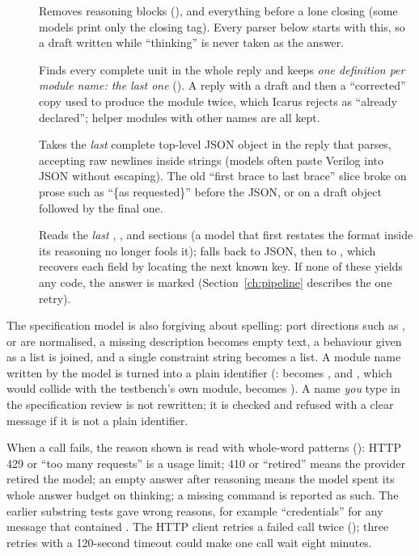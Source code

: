 \begin{description}
  \item[] Removes reasoning blocks (), and everything before a lone closing  (some models print only the closing tag). Every parser below starts with this, so a draft written while ``thinking'' is never taken as the answer.
  \item[] Finds every complete  unit in the whole reply and keeps \emph{one definition per module name: the last one} (). A reply with a draft and then a ``corrected'' copy used to produce the module twice, which Icarus rejects as ``already declared''; helper modules with other names are all kept.
  \item[] Takes the \emph{last} complete top-level JSON object in the reply that parses, accepting raw newlines inside strings (models often paste Verilog into JSON without escaping). The old ``first brace to last brace'' slice broke on prose such as ``\{as requested\}'' before the JSON, or on a draft object followed by the final one.
  \item[] Reads the \emph{last} , ,  and  sections (a model that first restates the format inside its reasoning no longer fools it); falls back to JSON, then to , which recovers each field by locating the next known key. If none of these yields any code, the answer is marked  (Section~\ref{ch:pipeline} describes the one retry).
\end{description}

The specification model is also forgiving about spelling: port directions such as ,  or  are normalised, a missing description becomes empty text, a behaviour given as a list is joined, and a single constraint string becomes a list. A module name written by the model is turned into a plain identifier (:  becomes , and , which would collide with the testbench's own module, becomes ). A name \emph{you} type in the specification review is not rewritten; it is checked and refused with a clear message if it is not a plain identifier.

When a call fails, the reason shown is read with whole-word patterns (): HTTP 429 or ``too many requests'' is a usage limit; 410 or ``retired'' means the provider retired the model; an empty answer after reasoning means the model spent its whole answer budget on thinking; a missing  command is reported as such. The earlier substring tests gave wrong reasons, for example ``credentials'' for any message that contained . The HTTP client retries a failed call twice (); three retries with a 120-second timeout could make one call wait eight minutes.

